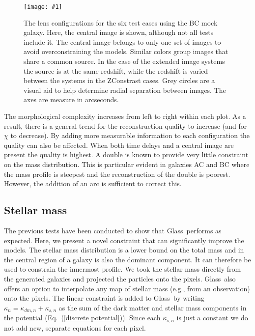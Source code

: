 \documentclass[galley]{mn2e}
\newcommand{\Glass}{{\sc Glass}}
\newcommand{\eqnref}[1] {Eq.~(\ref{#1})}
\newcommand\plotone[1]{%
 \centering
 \leavevmode
 \texttt{[image: \#1]}%
}%
\begin{document}
\begin{figure}
\plotone{BCarrival_surfaces}
\caption{The lens configurations for the six test cases using the BC mock galaxy. Here,
the central image is shown, although not all tests include it. The central image belongs
to only one set of images to avoid overconstraining the models. Similar colors group
images that share a common source. In the case of the extended image systems the source
is at the same redshift, while the redshift is varied between the systems in the 
ZConstrast cases. Grey circles are a visual aid to help determine radial separation
between images. The axes are measure in arcseconds.}
\label{reconstruction}
\end{figure}

The morphological complexity increases from left to right within each plot. As
a result, there is a general trend for the reconstruction quality to increase
(and for $\chi$ to decrease). By adding more measurable information to each
configuration the quality can also be affected. When both time delays and a
central image are present the quality is highest. A double is known to provide
very little constraint on the mass distribution. This is particular evident in
galaxies AC and BC where the mass profile is steepest and the reconstruction of
the double is poorest. However, the addition of an arc is sufficient to correct
this.

\subsection{Stellar mass}
\label{stellar mass}

The previous tests have been conducted to show that \Glass\ performs as expected.
Here, we present a novel constraint that can significantly improve the models. 
The stellar mass distribution is a lower bound on the total mass and in the
central region of a galaxy is also the dominant component. It can therefore be
used to constrain the innermost profile. We took the stellar mass directly from
the generated galaxies and projected the particles onto the pixels. \Glass\
also offers an option to interpolate any map of stellar mass (e.g., from an
observation) onto the pixels. The linear constraint is added to \Glass\ by
writing $\kappa_n = \kappa_{dm,n} + \kappa_{s,n}$ as the sum of the
dark matter and stellar mass components in the potential (\eqnref{discrete
potential}). Since each $\kappa_{s,n}$ is just a constant we do not add new,
separate equations for each pixel. 
\end{document}
